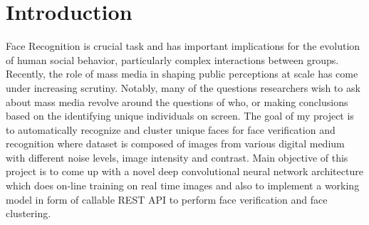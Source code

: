 \documentclass[a4paper,12pt, twoside]{NITKReport}
\begin{document}

\renewcommand{\chaptername}{CHAPTER}

\chapter{Introduction}
\label{chap1}

Face Recognition is crucial task and has important implications for the evolution of human social behavior, particularly complex interactions between groups. Recently, the role of mass media in shaping public perceptions at scale has come under increasing scrutiny. Notably, many of the questions researchers wish to ask about mass media revolve around the questions of who, or making conclusions based on the identifying unique individuals on screen. The goal of my project is to automatically recognize and cluster unique faces for face verification and recognition where dataset is composed of images from various digital medium with different noise levels, image intensity and contrast. Main objective of this project is to come up with a novel deep convolutional neural network architecture which does on-line training on real time images and also to implement a working model in form of callable REST API to perform face verification and face clustering.  
	
\end{document}
